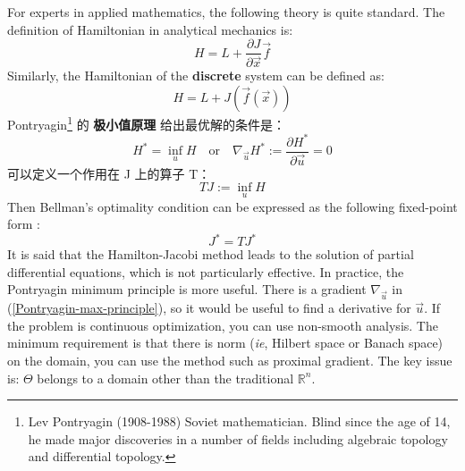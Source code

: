 \documentclass[12pt, orivec]{article}
\begin{document}

For experts in applied mathematics, the following theory is quite standard. The definition of Hamiltonian in analytical mechanics is:\begin{equation}
H = L + \frac{\partial J}{\partial \vec{x}} \vec{f}
\end{equation}
Similarly, the Hamiltonian of the \textbf{discrete} system can be defined as:\begin{equation}
H = L + J ( \vec{f}(\vec{x}) )
\end{equation}
Pontryagin\footnote{Lev Pontryagin (1908-1988) Soviet mathematician. Blind since the age of 14, he made major discoveries in a number of fields including algebraic topology and differential topology.} 的 \textbf{极小值原理} 给出最优解的条件是：\begin{equation}
\label{Pontryagin-max-principle}
H^* = \inf_u H \quad \mbox{or} \quad \nabla_{\vec{u}} H^* := \frac{\partial H^*}{\partial \vec{u}} = 0
\end{equation}
可以定义一个作用在 J 上的算子 T：
\begin{equation}
T J := \inf_u H
\end{equation}
Then Bellman's optimality condition can be expressed as the following fixed-point form \parencite{Bertsekas2013}:
\begin{equation}
J^* = T J^*
\end{equation}
It is said that the Hamilton-Jacobi method leads to the solution of partial differential equations, which is not particularly effective. In practice, the Pontryagin minimum principle is more useful.
There is a gradient $\nabla_{\vec{u}}$ in (\ref{Pontryagin-max-principle}), so it would be useful to find a derivative for $\vec{u}$. If the problem is continuous optimization, you can use non-smooth analysis. The minimum requirement is that there is norm (\textit{ie}, Hilbert space or Banach space) on the domain, you can use the method such as proximal gradient.
The key issue is: $\Theta$ belongs to a domain other than the traditional $\mathbb{R}^n$.
\end{document}
